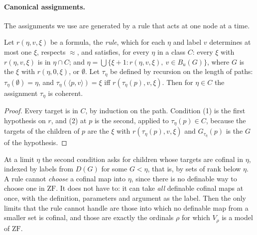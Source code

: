 \documentclass[10pt]{article}
\newcommand{\ZF}{\mathrm{ZF}}
\begin{document}
\paragraph{Canonical assignments.}
The assignments we use are generated by a rule that acts at one node at
a time.

\begin{lemma}\label{lem:rule}
Let $r(\eta,v,\xi)$ be a formula, the \emph{rule}, which for each $\eta$
and label $v$ determines at most one $\xi$, respects $\approx$, and satisfies,
for every $\eta$ in a class $C$: every $\xi$ with $r(\eta,v,\xi)$ is in $\eta\cap C$;
and $\eta=\bigcup\{\xi+1: r(\eta,v,\xi),\ v\in B_u(G)\}$, where $G$ is the $\xi$
with $r(\eta,0,\xi)$, or $\emptyset$. Let $\tau_\eta$ be defined by recursion on
the length of paths: $\tau_\eta(\emptyset)=\eta$, and $\tau_\eta(\langle p,v\rangle)=\xi$
iff $r(\tau_\eta(p),v,\xi)$. Then for $\eta\in C$ the assignment $\tau_\eta$ is
coherent.
\end{lemma}
\begin{proof}
Every target is in $C$, by induction on the path. Condition (1) is the
first hypothesis on $r$, and (2) at $p$ is the second, applied to
$\tau_\eta(p)\in C$, because the targets of the children of $p$ are the
$\xi$ with $r(\tau_\eta(p),v,\xi)$ and $G_{\tau_\eta}(p)$ is the $G$ of the hypothesis.
\end{proof}

At a limit $\eta$ the second condition asks for children whose targets
are cofinal in $\eta$, indexed by labels from $D(G)$ for some $G<\eta$, that
is, by sets of rank below $\eta$. A rule cannot \emph{choose} a cofinal map
into $\eta$, since there is no definable way to choose one in $\ZF$. It does
not have to: it can take \emph{all} definable cofinal maps at once, with
the definition, parameters and argument as the label. Then the only
limits that the rule cannot handle are those into which no definable
map from a smaller set is cofinal, and those are exactly the ordinals
$\rho$ for which $V_\rho$ is a model of $\ZF$.
\end{document}
